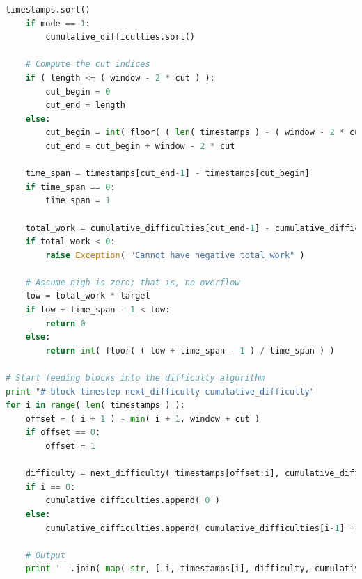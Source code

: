 \documentclass[12pt,english]{mrl}
\theoremstyle{definition}
\numberwithin{equation}{section}
\numberwithin{figure}{section}
\numberwithin{equation}{section}
\numberwithin{equation}{section}
\numberwithin{figure}{section}
\begin{document}
\begin{appendices}
\begin{lstlisting}[language=Python,basicstyle=\small,breaklines=true]
    timestamps.sort()
    if mode == 1:
        cumulative_difficulties.sort()

    # Compute the cut indices
    if ( length <= ( window - 2 * cut ) ):
        cut_begin = 0
        cut_end = length
    else:
        cut_begin = int( floor( ( len( timestamps ) - ( window - 2 * cut ) + 1 ) / 2 ) )
        cut_end = cut_begin + window - 2 * cut

    time_span = timestamps[cut_end-1] - timestamps[cut_begin]
    if time_span == 0:
        time_span = 1

    total_work = cumulative_difficulties[cut_end-1] - cumulative_difficulties[cut_begin]
    if total_work < 0:
        raise Exception( "Cannot have negative total work" )

    # Assume high is zero; that is, no overflow
    low = total_work * target
    if low + time_span - 1 < low:
        return 0
    else:
        return int( floor( ( low + time_span - 1 ) / time_span ) )

# Start feeding blocks into the difficulty algorithm
print "# block timestep next_difficulty cumulative_difficulty"
for i in range( len( timestamps ) ):
    offset = ( i + 1 ) - min( i + 1, window + cut )
    if offset == 0:
        offset = 1

    difficulty = next_difficulty( timestamps[offset:i], cumulative_difficulties[offset:i] )
    if i == 0:
        cumulative_difficulties.append( 0 )
    else:
        cumulative_difficulties.append( cumulative_difficulties[i-1] + difficulty )

    # Output
    print ' '.join( map( str, [ i, timestamps[i], difficulty, cumulative_difficulties[i] ] ) )
\end{lstlisting}



\end{appendices}

\medskip{}



\end{document}

